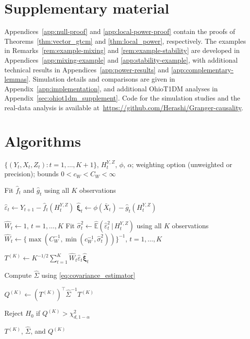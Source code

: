 \documentclass[12pt]{article}
\def\E{\mathbb{E}}
\newcommand\given{\,|\,}
\numberwithin{equation}{section}
\begin{document}
\section*{Supplementary material}
\label{SM}

{Appendices~\ref{app:null-proof} and
\ref{app:local-power-proof} contain the proofs of
Theorems~\ref{thm:vector_gtcm} and \ref{thm:local_power}, respectively.
The examples in Remarks~\ref{rem:example-mixing} and
\ref{rem:example-stability} are developed in
Appendices~\ref{app:mixing-example} and \ref{app:stability-example}, with
additional technical results in Appendices~\ref{app:power-results} and
\ref{app:complementary-lemmas}. Simulation details and comparisons are given
in Appendix~\ref{app:implementation}, and additional OhioT1DM analyses in
Appendix~\ref{sec:ohiot1dm_supplement}. Code for the simulation studies and
the real-data analysis is available at~\url{https://github.com/Herashi/Granger-causality}.}



\appendix




\section{Algorithms}

\begin{algorithm}[htbp]
\caption{Generalised temporal covariance measure}
\label{alg:GTCM}
\begin{algorithmic}[1]

\Require $\{(Y_t,X_t,Z_t):t=1,\ldots,K+1\}$, 
         $H_t^{Y,Z}$, $\phi$, $\alpha$;
         weighting option (unweighted or precision);
         bounds $0<c_W<C_W<\infty$

\State Fit $\hat f_t$ and $\hat g_t$ using all $K$ observations

    \State $\hat\varepsilon_t
        \gets Y_{t+1}-\hat f_t(H_t^{Y,Z})$
    \State $\hat{\boldsymbol\xi}_t
        \gets \phi(\bar X_t)-\hat g_t(H_t^{Y,Z})$
\EndFor

    \State $\hat W_t\gets 1$, $t=1,\ldots,K$
\Else
    \State Fit
    $\hat\sigma_t^2
        \gets \widehat{\E}(\hat\varepsilon_t^2\given H_t^{Y,Z})$
    \Statex \hspace{\algorithmicindent}
        using all $K$ observations
    \State $\hat W_t
        \gets
        \{\max(C_W^{-1},
        \min(c_W^{-1},\hat\sigma_t^2))\}^{-1}$,
        $t=1,\ldots,K$
\EndIf

\State $T^{(K)}
    \gets K^{-1/2}
    \sum_{t=1}^K
    \hat W_t\hat\varepsilon_t\hat{\boldsymbol\xi}_t$

\State Compute $\hat\Sigma$ using \eqref{eq:covariance_estimator}

\State $Q^{(K)}
    \gets
    (T^{(K)})^\top
    \hat\Sigma^{-1}
    T^{(K)}$

\State Reject $H_0$ if
    $Q^{(K)}>\chi^2_{d,1-\alpha}$

\Ensure $T^{(K)}$, $\hat\Sigma$, and $Q^{(K)}$

\end{algorithmic}
\end{algorithm}
\end{document}
